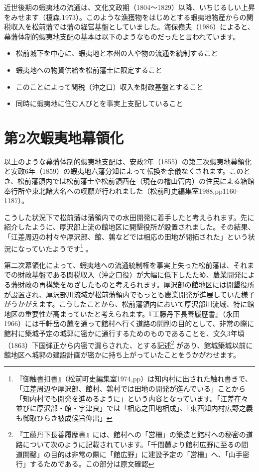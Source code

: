 \documentclass[11pt,report]{jsbook}
\begin{document}
近世後期の蝦夷地の流通は、文化文政期（1804〜1829）以降、いちじるしい上昇をみせます（榎森,1973）。このような漁獲物をはじめとする蝦夷地物産からの関税収入を松前藩では藩の経営基盤としていました。海保嶺夫（1986）によると、幕藩体制的蝦夷地支配の基本は以下のようなものだったと言われています。

\begin{itemize}
\item 松前城下を中心に、蝦夷地と本州の人や物の流通を統制すること
\item 蝦夷地への物資供給を松前藩士に限定すること
\item このことによって関税（沖之口）収入を財政基盤とすること
\item 同時に蝦夷地に住む人びとを事実上支配していること
\end{itemize}

\section{第2次蝦夷地幕領化}
以上のような幕藩体制的蝦夷地支配は、安政2年（1855）の第二次蝦夷地幕領化と安政6年（1859）の蝦夷地六藩分知によって転換を余儀なくされます。このとき、松前藩領内では松前藩士や松前領西在（現在の檜山管内）の住民による箱館奉行所や東北諸大名への嘆願が行われました（松前町史編集室1988,pp1160-1187）。

こうした状況下で松前藩は藩領内での水田開発に着手したと考えられます。先に紹介したように、厚沢部上流の館地区に開墾役所が設置されました。その結果、「江差周辺の村々や厚沢部、館、鶉などでは相応の田地が開拓された」という状況になっていたようです\footnote{
『御触書扣書』（松前町史編集室1974,pp）は知内村に出された触れ書きで、「江差周辺や厚沢部、館村、鶉村では田地の開発が進んでいる」ことから「知内村でも開発を進めるように」という内容となっています。「江差在々並びに厚沢部・館・宇津良」では「相応之田地相成」、「東西知内村広野之義も御取ひらき被成候旨仰出」
}
。

第二次幕領化によって、蝦夷地への流通統制権を事実上失った松前藩は、それまでの財政基盤である関税収入（沖之口役）が大幅に低下したため、農業開発による藩財政の再構築をめざしたものと考えられます。厚沢部の館地区には開墾役所が設置され、厚沢部川流域が松前藩領内でもっとも農業開発が進展していた様子がうかがえます。こうしたことから、松前藩領内において厚沢部川流域、特に館地区の重要性が高まっていたと考えられます。『工藤丹下長善履歴書』（永田1966）には千軒岳の麓を通って館村へ行く道路の開削の目的として、非常の際に館村に築城予定の城郭に密かに通行するためのものであることを、文久3年頃（1863）下国弾正から内密で漏らされた、とする記述\footnote{
『工藤丹下長善履歴書』には、館村への「営柵」の築造と館村への秘密の道路について次のように記載されています。「千間麓より館村広野に至るの間道開鑿」の目的は非常の際に「館広野」に建設予定の「営柵」へ、「山手密行」するためである。この部分は原文確認
}
があり、館城築城以前に館地区へ城郭の建設計画が密かに持ち上がっていたことをうかがわせます。
\end{document}
